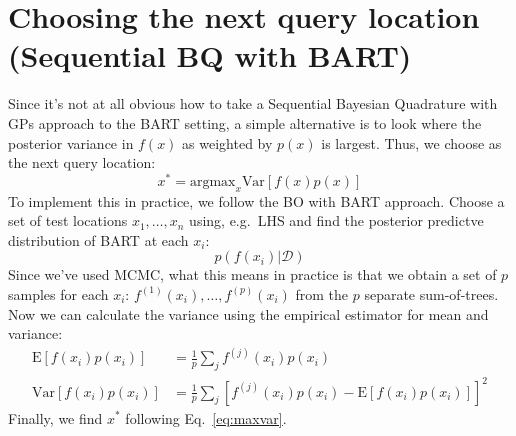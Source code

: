 \documentclass[12pt]{article}
\begin{document}
\section{Choosing the next query location (Sequential BQ with BART)}
Since it's not at all obvious how to take a Sequential Bayesian Quadrature with GPs approach to the BART setting,
a simple alternative is to look where the posterior variance in $f(x)$ as weighted by $p(x)$ is largest.
Thus, we choose as the next query location:
\begin{equation}
	x^* = \mbox{argmax}_{x} \mbox{Var}[f(x)p(x)]
	\label{eq:maxvar}
\end{equation}
To implement this in practice, we follow the BO with BART approach. Choose a set of test locations $x_1, \ldots, x_n$
using, e.g.~LHS and find the posterior predictve distribution of BART at each $x_i$:
\begin{equation}
	p(f(x_i) | \mathcal{D})
\end{equation}
Since we've used MCMC, what this means in practice is that we obtain a set of $p$ samples for each $x_i$: $f^{(1)}(x_i), \ldots, f^{(p)}(x_i)$ from the $p$ separate sum-of-trees. 
Now we can calculate the variance using the empirical estimator for mean and variance:
\begin{align}
	\mbox{E}[f(x_i)p(x_i)] &= \frac{1}{p} \sum_j f^{(j)}(x_i)p(x_i) \\
	\mbox{Var}[f(x_i)p(x_i)] &= \frac{1}{p} \sum_j \left[f^{(j)}(x_i)p(x_i) - \mbox{E}[f(x_i)p(x_i)]\right]^2
\end{align}
Finally, we find $x^*$ following Eq.~\eqref{eq:maxvar}.
\end{document}
